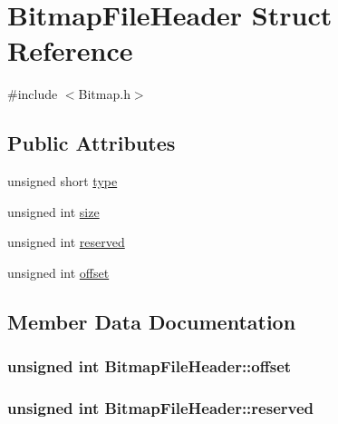\hypertarget{structBitmapFileHeader}{}\section{Bitmap\+File\+Header Struct Reference}
\label{structBitmapFileHeader}


{\ttfamily \#include $<$Bitmap.\+h$>$}

\subsection*{Public Attributes}
\begin{DoxyCompactItemize}
\item 
unsigned short \hyperlink{structBitmapFileHeader_a139c2c2645bc00ddf4f5dc552872c1d1}{type}
\item 
unsigned int \hyperlink{structBitmapFileHeader_a0dcad71d9b17783c4d296c2c6d00ede0}{size}
\item 
unsigned int \hyperlink{structBitmapFileHeader_ab3833d77e2c28a216859a80ba8fac9f0}{reserved}
\item 
unsigned int \hyperlink{structBitmapFileHeader_a26ed598693b100ffd9e29c4dc77f3d92}{offset}
\end{DoxyCompactItemize}


\subsection{Member Data Documentation}
\subsubsection[{\texorpdfstring{offset}{offset}}]{\setlength{\rightskip}{0pt plus 5cm}unsigned int Bitmap\+File\+Header\+::offset}\hypertarget{structBitmapFileHeader_a26ed598693b100ffd9e29c4dc77f3d92}{}\label{structBitmapFileHeader_a26ed598693b100ffd9e29c4dc77f3d92}
\subsubsection[{\texorpdfstring{reserved}{reserved}}]{\setlength{\rightskip}{0pt plus 5cm}unsigned int Bitmap\+File\+Header\+::reserved}\hypertarget{structBitmapFileHeader_ab3833d77e2c28a216859a80ba8fac9f0}{}\label{structBitmapFileHeader_ab3833d77e2c28a216859a80ba8fac9f0}
